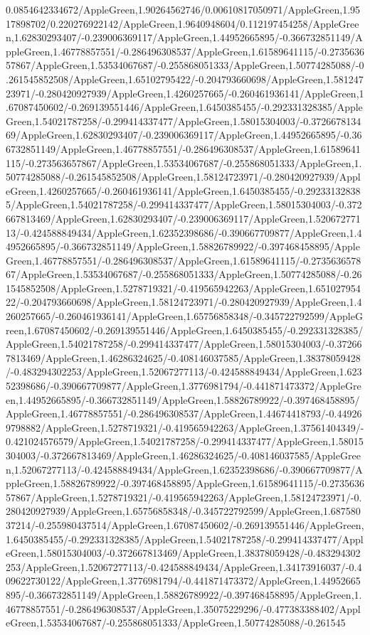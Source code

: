 {\begin{tikzternal}
{0.0854642334672/AppleGreen,1.90264562746/0.00610817050971/AppleGreen,1.9517898702/0.220276922142/AppleGreen,1.9640948604/0.112197454258/AppleGreen,1.62830293407/-0.239006369117/AppleGreen,1.44952665895/-0.366732851149/AppleGreen,1.46778857551/-0.286496308537/AppleGreen,1.61589641115/-0.273563657867/AppleGreen,1.53534067687/-0.255868051333/AppleGreen,1.50774285088/-0.261545852508/AppleGreen,1.65102795422/-0.204793660698/AppleGreen,1.58124723971/-0.280420927939/AppleGreen,1.4260257665/-0.260461936141/AppleGreen,1.67087450602/-0.269139551446/AppleGreen,1.6450385455/-0.292331328385/AppleGreen,1.54021787258/-0.299414337477/AppleGreen,1.58015304003/-0.372667813469/AppleGreen,1.62830293407/-0.239006369117/AppleGreen,1.44952665895/-0.366732851149/AppleGreen,1.46778857551/-0.286496308537/AppleGreen,1.61589641115/-0.273563657867/AppleGreen,1.53534067687/-0.255868051333/AppleGreen,1.50774285088/-0.261545852508/AppleGreen,1.58124723971/-0.280420927939/AppleGreen,1.4260257665/-0.260461936141/AppleGreen,1.6450385455/-0.292331328385/AppleGreen,1.54021787258/-0.299414337477/AppleGreen,1.58015304003/-0.372667813469/AppleGreen,1.62830293407/-0.239006369117/AppleGreen,1.52067277113/-0.424588849434/AppleGreen,1.62352398686/-0.390667709877/AppleGreen,1.44952665895/-0.366732851149/AppleGreen,1.58826789922/-0.397468458895/AppleGreen,1.46778857551/-0.286496308537/AppleGreen,1.61589641115/-0.273563657867/AppleGreen,1.53534067687/-0.255868051333/AppleGreen,1.50774285088/-0.261545852508/AppleGreen,1.5278719321/-0.419565942263/AppleGreen,1.65102795422/-0.204793660698/AppleGreen,1.58124723971/-0.280420927939/AppleGreen,1.4260257665/-0.260461936141/AppleGreen,1.65756858348/-0.345722792599/AppleGreen,1.67087450602/-0.269139551446/AppleGreen,1.6450385455/-0.292331328385/AppleGreen,1.54021787258/-0.299414337477/AppleGreen,1.58015304003/-0.372667813469/AppleGreen,1.46286324625/-0.408146037585/AppleGreen,1.38378059428/-0.483294302253/AppleGreen,1.52067277113/-0.424588849434/AppleGreen,1.62352398686/-0.390667709877/AppleGreen,1.3776981794/-0.441871473372/AppleGreen,1.44952665895/-0.366732851149/AppleGreen,1.58826789922/-0.397468458895/AppleGreen,1.46778857551/-0.286496308537/AppleGreen,1.44674418793/-0.449269798882/AppleGreen,1.5278719321/-0.419565942263/AppleGreen,1.37561404349/-0.421024576579/AppleGreen,1.54021787258/-0.299414337477/AppleGreen,1.58015304003/-0.372667813469/AppleGreen,1.46286324625/-0.408146037585/AppleGreen,1.52067277113/-0.424588849434/AppleGreen,1.62352398686/-0.390667709877/AppleGreen,1.58826789922/-0.397468458895/AppleGreen,1.61589641115/-0.273563657867/AppleGreen,1.5278719321/-0.419565942263/AppleGreen,1.58124723971/-0.280420927939/AppleGreen,1.65756858348/-0.345722792599/AppleGreen,1.68758037214/-0.255980437514/AppleGreen,1.67087450602/-0.269139551446/AppleGreen,1.6450385455/-0.292331328385/AppleGreen,1.54021787258/-0.299414337477/AppleGreen,1.58015304003/-0.372667813469/AppleGreen,1.38378059428/-0.483294302253/AppleGreen,1.52067277113/-0.424588849434/AppleGreen,1.34173916037/-0.409622730122/AppleGreen,1.3776981794/-0.441871473372/AppleGreen,1.44952665895/-0.366732851149/AppleGreen,1.58826789922/-0.397468458895/AppleGreen,1.46778857551/-0.286496308537/AppleGreen,1.35075229296/-0.477383388402/AppleGreen,1.53534067687/-0.255868051333/AppleGreen,1.50774285088/-0.261545}
\end{tikzternal}}
